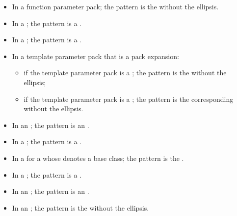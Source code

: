 \begin{itemize}
\item In a function parameter pack; the pattern is the
 without the ellipsis.

\item In a ;
the pattern is a .

\item In a ;
the pattern is a .

\item In a template parameter pack that is a pack expansion:
\begin{itemize}
\item
if the template parameter pack is a ;
the pattern is the  without the ellipsis;

\item
if the template parameter pack is a ;
the pattern is the corresponding 
without the ellipsis.
\end{itemize}

\item In an ;
the pattern is an .

\item In a ;
the pattern is a .

\item In a  for a
 whose  denotes a
base class; the pattern is the .

\item In a ;
the pattern is a .

\item In an ; the pattern is
an .

\item In an ; the pattern is
the  without the ellipsis.


\end{itemize}
